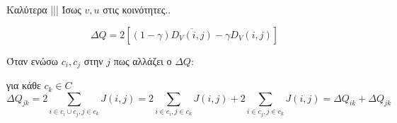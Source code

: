 \documentclass[12pt, letterpaper]{article}
\begin{document}
Καλύτερα ||| Ίσως $v,u$ στις κοινότητες..

\[ \Delta Q = 2 [ (1 - \gamma)   \overline{ D_V(i,j)}- \gamma D_V(i,j) ]\]



Όταν ενώσω $c_i,c_j$ στην $j$ πως αλλάζει ο $\Delta Q$:

για κάθε $c_k \in C$
\[ \Delta Q_{jk} = 2 \sum_{i \in c_i \cup c_j, j \in c_k} J(i,j) = 2 \sum_{i \in c_i, j \in c_k} J(i,j) + 2 \sum_{i \in c_j, j \in c_k} J(i,j) = \Delta Q_{ik} + \Delta Q_{jk}\]




\renewcommand{\refname}{\selectlanguage{greek} Αναφορές}  


\end{document}
